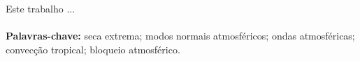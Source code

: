 
Este trabalho ...
\\
\\

\noindent \textbf{Palavras-chave:} seca extrema; modos normais atmosféricos; ondas atmosféricas; convecção tropical; bloqueio atmosférico.
